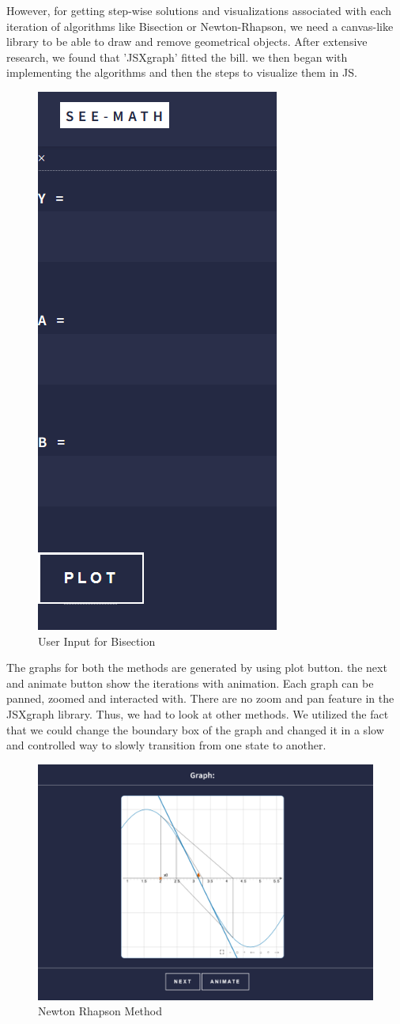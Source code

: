 However, for getting step-wise solutions and visualizations associated with each iteration of algorithms like Bisection or Newton-Rhapson, we need a canvas-like library to be able to draw and remove geometrical objects. After extensive research, we found that 'JSXgraph' fitted the bill. we then began with implementing the algorithms and then the steps to visualize them in JS.

\begin{figure}[h!]
	\centering
	\includegraphics[width=0.24\linewidth]{seemath4}
	\caption{User Input for Bisection}
\end{figure}

\pagebreak
The graphs for both the methods are generated by using plot button. the next and animate button show the iterations with animation. Each graph can be panned, zoomed and interacted with. 
There are no zoom and pan feature in the JSXgraph library. Thus, we had to look at other methods. We utilized the fact that we could change the boundary box of the graph and changed it in a slow and controlled way to slowly transition from one state to another.
\begin{figure}[h!]
	\centering
	\includegraphics[width=0.89\linewidth]{seemath6}
	\caption{Newton Rhapson Method}
\end{figure}

